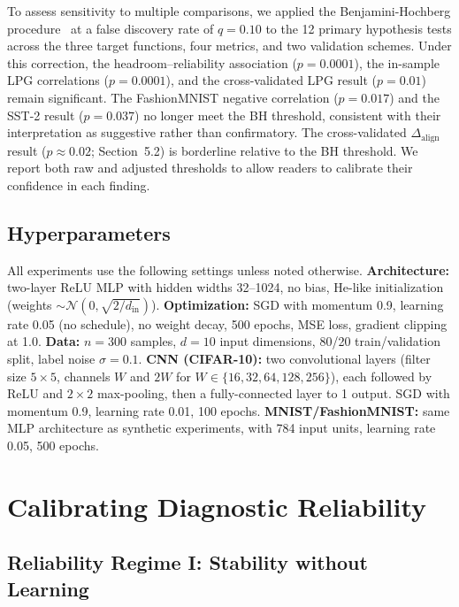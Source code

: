 \documentclass[twoside,11pt]{article}
\begin{document}
To assess sensitivity to multiple comparisons, we applied the Benjamini-Hochberg procedure~\citep{benjamini1995controlling} at a false discovery rate of $q=0.10$ to the 12 primary hypothesis tests across the three target functions, four metrics, and two validation schemes. Under this correction, the headroom--reliability association ($p=0.0001$), the in-sample LPG correlations ($p=0.0001$), and the cross-validated LPG result ($p=0.01$) remain significant. The FashionMNIST negative correlation ($p=0.017$) and the SST-2 result ($p=0.037$) no longer meet the BH threshold, consistent with their interpretation as suggestive rather than confirmatory. The cross-validated $\Delta_{\text{align}}$ result ($p \approx 0.02$; Section~5.2) is borderline relative to the BH threshold. We report both raw and adjusted thresholds to allow readers to calibrate their confidence in each finding.

\subsection{Hyperparameters}
All experiments use the following settings unless noted otherwise.  \textbf{Architecture:} two-layer ReLU MLP with hidden widths 32--1024, no bias, He-like initialization (weights $\sim \mathcal{N}(0, \sqrt{2/d_{\text{in}}})$).  \textbf{Optimization:} SGD with momentum 0.9, learning rate 0.05 (no schedule), no weight decay, 500 epochs, MSE loss, gradient clipping at 1.0.  \textbf{Data:} $n=300$ samples, $d=10$ input dimensions, 80/20 train/validation split, label noise $\sigma=0.1$.  \textbf{CNN (CIFAR-10):} two convolutional layers (filter size $5\times5$, channels $W$ and $2W$ for $W\in\{16,32,64,128,256\}$), each followed by ReLU and $2\times2$ max-pooling, then a fully-connected layer to 1 output.  SGD with momentum 0.9, learning rate 0.01, 100 epochs.  \textbf{MNIST/FashionMNIST:} same MLP architecture as synthetic experiments, with 784 input units, learning rate 0.05, 500 epochs.

\section{Calibrating Diagnostic Reliability}
\label{sec:results}

\subsection{Reliability Regime I: Stability without Learning}
\label{sec:stability}
\end{document}
